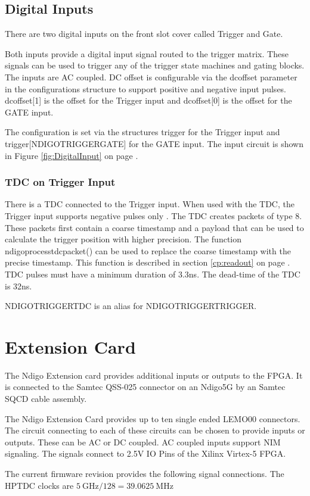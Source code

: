 \subsection{Digital Inputs}
%
There are two digital inputs on the front slot cover called Trigger and Gate.\par
Both inputs provide a digital input signal routed to the trigger matrix. These signals can be used to trigger any of the trigger state machines and gating blocks. The inputs are AC coupled. DC offset is configurable via the \textsf{dc\tu offset} parameter in the configurations structure to support positive and negative input pulses. \textsf{dc\tu offset[1]} is the offset for the Trigger input and \textsf{dc\tu offset[0]} is the offset for the GATE input.\par
The configuration is set via the structures \textsf{trigger} for the Trigger input and \textsf{trigger[NDIGO\tu TRIGGER\tu GATE]} for the GATE input. The input circuit is shown in Figure \ref{fig:DigitalInput} on page \pageref{fig:DigitalInput}.
%
%
%
\subsubsection{TDC on Trigger Input}
%
There is a TDC connected to the Trigger input. When used with the TDC, the Trigger input supports negative pulses only . The TDC creates packets of type 8. These packets first contain a coarse timestamp and a payload that can be used to calculate the trigger position with higher precision. The function \textsf{ndigo\tu process\tu tdc\tu packet()} can be used to replace the coarse timestamp with the precise timestamp. This function is described in section \ref{cp:readout} on page \pageref{cp:readout}.
TDC pulses must have a minimum duration of 3.3ns. The dead-time of the TDC is 32ns.

\textsf{NDIGO\tu TRIGGER\tu TDC} is an alias for \textsf{NDIGO\tu TRIGGER\tu TRIGGER}.
%
%
%
%
%
\section{Extension Card\label{cp:extcard}}

The Ndigo Extension card provides additional inputs or outputs to the FPGA. It is connected to the Samtec QSS-025 connector on an Ndigo5G by an Samtec SQCD cable assembly.\par
The Ndigo Extension Card provides up to ten single ended LEMO00 connectors. The circuit connecting to each of these circuits can be chosen to provide inputs or outputs. These can be AC or DC coupled. AC coupled inputs support NIM signaling. The signals connect to 2.5V IO Pins of the Xilinx Virtex-5 FPGA.\par
The current firmware revision provides the following signal connections. The HPTDC clocks are $\SI{5}{\giga\hertz} / 128 = \SI{39.0625}{\mega\hertz}$\par

